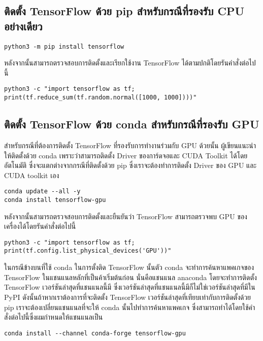 \subsection{ติดตั้ง TensorFlow ด้วย pip สำหรับกรณีที่รองรับ CPU อย่างเดียว}

\begin{lstlisting}[style=MyBash]
python3 -m pip install tensorflow
\end{lstlisting}

\vspace{1em}
หลังจากนั้นสามารถตรวจสอบการติดตั้งและเรียกใช้งาน TensorFlow ได้ตามปกติโดยรันคำสั่งต่อไปนี้

\begin{lstlisting}[style=MyBash]
python3 -c "import tensorflow as tf; print(tf.reduce_sum(tf.random.normal([1000, 1000])))"
\end{lstlisting}

\subsection{ติดตั้ง TensorFlow ด้วย conda สำหรับกรณีที่รองรับ GPU}

สำหรับกรณีที่ต้องการติดตั้ง TensorFlow ที่รองรับการทำงานร่วมกับ GPU ด้วยนั้น ผู้เขียนแนะนำให้ติดตั้งด้วย conda เพราะว่าสามารถติดตั้ง Driver ของการ์ดจอและ CUDA Toolkit ได้โดยอัตโนมัติ ซึ่งจะแตกต่างจากกรณีที่ติดตั้งด้วย pip ซึ่งเราจะต้องทำการติดตั้ง Driver ของ GPU และ CUDA toolkit เอง

\begin{lstlisting}[style=MyBash]
conda update --all -y
conda install tensorflow-gpu
\end{lstlisting}

\vspace{1em}

\noindent หลังจากนั้นสามารถตรวจสอบการติดตั้งและยืนยันว่า TensorFlow สามารถตรวจพบ GPU ของเครื่องได้โดยรันคำสั่งต่อไปนี้

\begin{lstlisting}[style=MyBash]
python3 -c "import tensorflow as tf; print(tf.config.list_physical_devices('GPU'))"
\end{lstlisting}

\vspace{1em}

ในกรณีข้างบนที่ใช้ conda ในการตั้งติด TensorFlow นั้นตัว conda จะทำการค้นหาแพคเกจของ TensorFlow ในแชนแนลหลักที่เป็นค้าเริ่มต้นก่อน นั่นคือแชนแนล anaconda โดยจะทำการติดตั้ง TensorFlow เวอร์ชันล่าสุดที่แชนแนลนี้มี ซึ่งเวอร์ชันล่าสุดที่แชนแนลนี้มีก็ไม่ใช่เวอร์ชันล่าสุดที่มีใน PyPI ดังนั้นถ้าหากเราต้องการที่จะติดตั้ง TensorFlow เวอร์ชันล่าสุดที่เทียบเท่ากับการติดตั้งด้วย pip เราจะต้องเปลี่ยนแชนแนลที่จะให้ conda นั้นไปทำการค้นหาแพคเกจ ซึ่งสามารถทำได้โดยใช้คำสั่งต่อไปนี้ซึ่งผมกำหนดให้แชนแนลเป็น 

\begin{lstlisting}[style=MyBash]
    conda install --channel conda-forge tensorflow-gpu
\end{lstlisting}
